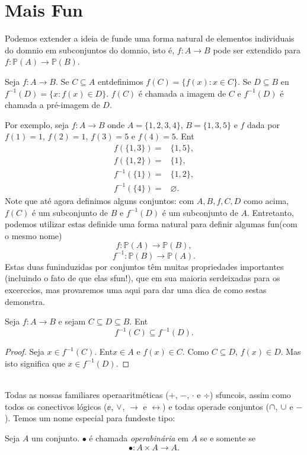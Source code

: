 \section{Mais Fun\cois}\label{mfuncoes}

Podemos extender a ideia de fun\cao de uma forma natural de elementos individuais do dom\ih nio em subconjuntos do dom\ih nio, isto \'e, $f:A\to B$ pode ser extendido para $f:\mathbb{P}(A)\to \mathbb{P}(B)$.
\begin{definb}
Seja $f:A\to B$. Se $C\subseteq A$ ent\ao definimos $f(C)=\{f(x): x\in C\}$. Se $D\subseteq B$ en\tao $f^{-1}(D)=\{x: f(x)\in D\}$. $f(C)$ \'e chamada a imagem de $C$ e $f^{-1}(D)$ \'e chamada a pr\'e-imagem de $D$.
\end{definb}

Por exemplo, seja $f:A\to B$ onde $A=\{1,2,3,4\}$, $B=\{1,3,5\}$ e $f$ dada por $f(1)=1$, $f(2)=1$, $f(3)=5$ e $f(4)=5$. Ent\ao
\begin{equation*}
 \begin{aligned}
f(\{1,3\})=&\{1,5\},\\
f(\{1,2\})=&\{1\},\\
f^{-1}(\{1\})=&\{1,2\},\\
f^{-1}(\{4\})=&\varnothing.
 \end{aligned}
\end{equation*}
Note que at\'e agora definimos alguns conjuntos: com $A,B,f,C,D$ como acima, $f(C)$ \'e um subconjunto de $B$ e $f^{-1}(D)$ \'e um subconjunto de $A$. Entretanto, podemos utilizar estas defini\coes de uma forma natural para definir algumas fun\coes (com o mesmo nome)
\[
f:\mathbb{P}(A)\to \mathbb{P}(B),
\]
\[
f^{-1}:\mathbb{P}(B)\to \mathbb{P}(A).
\]
Estas duas fun\coes induzidas por conjuntos t\^em muitas propriedades importantes (incluindo o fato de que elas s\ao fun\cois!), que em sua maioria ser\ao deixadas para os excerc\ih cios, mas provaremos uma aqui para dar uma dica de como s\ao estas demonstra\cois.
\begin{teob}
Seja $f:A\to B$ e sejam $C\subseteq D \subseteq B$. Ent\ao
\[
f^{-1}(C)\subseteq f^{-1}(D).
\]
\end{teob}
\begin{proof}
Seja $x\in f^{-1}(C)$. Ent\ao $x\in A$ e $f(x)\in C$. Como $C\subseteq D$, $f(x)\in D$. Mas isto significa que $x\in f^{-1}(D)$.
\end{proof}
\\

Todas as nossas familiares opera\coes aritm\'eticas ($+$, $-$, $\cdot$ e $\div$) s\ao funcois, assim como todos os conectivos l\'ogicos ($\ee$, $\vee$, $\rightarrow$ e $\leftrightarrow$) e todas opera\coes de conjuntos ($\cap$, $\cup$ e $-$). Temos um nome especial para fun\coes deste tipo:
\begin{definb}
Seja $A$ um conjunto. $\bullet$ \'e chamada {\it opera\cao bin\'aria} em $A$ se e somente se 
\[
\bullet :A\times A\to A.
\]
\end{definb}

